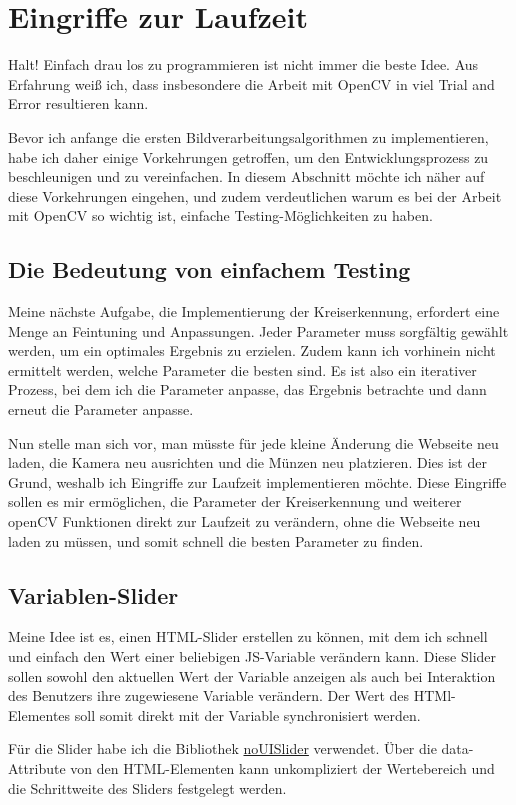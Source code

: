\section{Eingriffe zur Laufzeit}
Halt! Einfach drau los zu programmieren ist nicht immer die beste Idee. Aus Erfahrung weiß ich, dass insbesondere die Arbeit mit OpenCV in viel Trial and Error resultieren kann. 

Bevor ich anfange die ersten Bildverarbeitungsalgorithmen zu implementieren, habe ich daher einige Vorkehrungen getroffen, um den Entwicklungsprozess zu beschleunigen und zu vereinfachen. In diesem Abschnitt möchte ich näher auf diese Vorkehrungen eingehen, und zudem verdeutlichen warum es bei der Arbeit mit OpenCV so wichtig ist, einfache Testing-Möglichkeiten zu haben.

\subsection{Die Bedeutung von einfachem Testing}
Meine nächste Aufgabe, die Implementierung der Kreiserkennung, erfordert eine Menge an Feintuning und Anpassungen. Jeder Parameter muss sorgfältig gewählt werden, um ein optimales Ergebnis zu erzielen. Zudem kann ich vorhinein nicht ermittelt werden, welche Parameter die besten sind. Es ist also ein iterativer Prozess, bei dem ich die Parameter anpasse, das Ergebnis betrachte und dann erneut die Parameter anpasse.

Nun stelle man sich vor, man müsste für jede kleine Änderung die Webseite neu laden, die Kamera neu ausrichten und die Münzen neu platzieren. Dies ist der Grund, weshalb ich Eingriffe zur Laufzeit implementieren möchte. Diese Eingriffe sollen es mir ermöglichen, die Parameter der Kreiserkennung und weiterer openCV Funktionen direkt zur Laufzeit zu verändern, ohne die Webseite neu laden zu müssen, und somit schnell die besten Parameter zu finden.

\subsection{Variablen-Slider}
Meine Idee ist es, einen HTML-Slider erstellen zu können, mit dem ich schnell und einfach den Wert einer beliebigen JS-Variable verändern kann. Diese Slider sollen sowohl den aktuellen Wert der Variable anzeigen als auch bei Interaktion des Benutzers ihre zugewiesene Variable verändern. Der Wert des HTMl-Elementes soll somit direkt mit der Variable synchronisiert werden.

Für die Slider habe ich die Bibliothek \href{https://refreshless.com/nouislider/}{noUISlider} verwendet.  Über die data-Attribute von den HTML-Elementen kann unkompliziert der Wertebereich und die Schrittweite des Sliders festgelegt werden.

